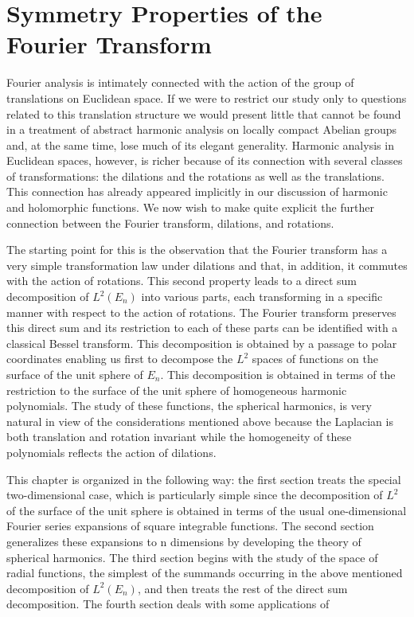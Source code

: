 \chapter{Symmetry Properties of the Fourier Transform}
\label{ch:c4}

Fourier analysis is intimately connected with the action of the group of translations on Euclidean space. If we were to restrict our study only to questions related to this translation structure we would present little that cannot be found in a treatment of abstract harmonic analysis on locally compact Abelian groups and, at the same time, lose much of its elegant generality. Harmonic analysis in Euclidean spaces, however, is richer because of its connection with several classes of transformations: the dilations and the rotations as well as the translations. This connection has already appeared implicitly in our discussion of harmonic and holomorphic functions. We now wish to make quite explicit the further connection between the Fourier transform, dilations, and rotations.

The starting point for this is the observation that the Fourier transform has a very simple transformation law under dilations and that, in addition, it commutes with the action of rotations. This second property leads to a direct sum decomposition of $L^{2}(E_n)$ into various parts, each transforming in a specific manner with respect to the action of rotations. The Fourier transform preserves this direct sum and its restriction to each of these parts can be identified with a classical Bessel transform. This decomposition is obtained by a passage to polar coordinates enabling us first to decompose the $L^{2}$ spaces of functions on the surface of the unit sphere of $E_n$. This decomposition is obtained in terms of the restriction to the surface of the unit sphere of homogeneous harmonic polynomials. The study of these functions, the spherical harmonics, is very natural in view of the considerations mentioned above because the Laplacian is both translation and rotation invariant while the homogeneity of these polynomials reflects the action of dilations.

This chapter is organized in the following way: the first section treats the special two-dimensional case, which is particularly simple since the decomposition of $L^{2}$ of the surface of the unit sphere is obtained in terms of the usual one-dimensional Fourier series expansions of square integrable functions. The second section generalizes these expansions to n dimensions by developing the theory of spherical harmonics. The third section begins with the study of the space of radial functions, the simplest of the summands occurring in the above mentioned decomposition of $L^{2}(E_{n})$, and then treats the rest of the direct sum decomposition. The fourth section deals with some applications of

